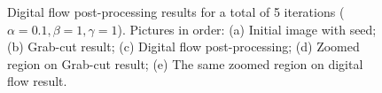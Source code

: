 \documentclass[runningheads]{llncs}
\begin{document}
\begin{figure}[!ht]
		\hspace{15pt}		
		\caption{Digital flow post-processing results for a total of 5 iterations ($\alpha=0.1, \beta=1,\gamma=1$). Pictures in order: (a) Initial image with seed; (b) Grab-cut result; (c) Digital flow post-processing; (d) Zoomed region on Grab-cut result; (e) The same zoomed region on digital flow result. }
		\label{fig:butterfly_results}
	\end{figure}


%
%
%


\end{document}
